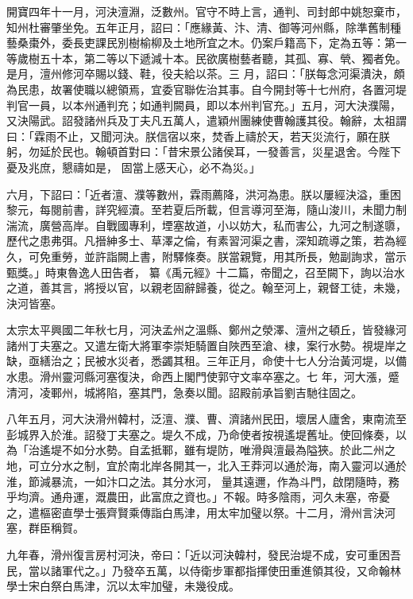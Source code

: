 \begin{pinyinscope}
 開寶四年十一月，河決澶淵，泛數州。官守不時上言，通判、司封郎中姚恕棄市，知州杜審肇坐免。五年正月，詔曰：「應緣黃、汴、清、御等河州縣，除準舊制種藝桑棗外，委長吏課民別樹榆柳及土地所宜之木。仍案戶籍高下，定為五等：第一等歲樹五十本，第二等以下遞減十本。民欲廣樹藝者聽，其孤、寡、煢、獨者免。是月，澶州修河卒賜以錢、鞋，役夫給以茶。三
 月，詔曰：「朕每念河渠潰決，頗為民患，故署使職以總領焉，宜委官聯佐治其事。自今開封等十七州府，各置河堤判官一員，以本州通判充；如通判闕員，即以本州判官充。」五月，河大決濮陽，又決陽武。詔發諸州兵及丁夫凡五萬人，遣穎州團練使曹翰護其役。翰辭，太祖謂曰：「霖雨不止，又聞河決。朕信宿以來，焚香上禱於天，若天災流行，願在朕躬，勿延於民也。翰頓首對曰：「昔宋景公諸侯耳，一發善言，災星退舍。今陛下憂及兆庶，懇禱如是，
 固當上感天心，必不為災。」



 六月，下詔曰：「近者澶、濮等數州，霖雨薦降，洪河為患。朕以屢經決溢，重困黎元，每閱前書，詳究經瀆。至若夏后所載，但言導河至海，隨山浚川，未聞力制湍流，廣營高岸。自戰國專利，堙塞故道，小以妨大，私而害公，九河之制遂隳，歷代之患弗弭。凡搢紳多士、草澤之倫，有素習河渠之書，深知疏導之策，若為經久，可免重勞，並許詣闕上書，附驛條奏。朕當親覽，用其所長，勉副詢求，當示甄獎。」時東魯逸人田告者，
 纂《禹元經》十二篇，帝聞之，召至闕下，詢以治水之道，善其言，將授以官，以親老固辭歸養，從之。翰至河上，親督工徒，未幾，決河皆塞。



 太宗太平興國二年秋七月，河決孟州之溫縣、鄭州之滎澤、澶州之頓丘，皆發緣河諸州丁夫塞之。又遣左衛大將軍李崇矩騎置自陜西至滄、棣，案行水勢。視堤岸之缺，亟繕治之；民被水災者，悉蠲其租。三年正月，命使十七人分治黃河堤，以備水患。滑州靈河縣河塞復決，命西上閣門使郭守文率卒塞之。七
 年，河大漲，蹙清河，凌鄆州，城將陷，塞其門，急奏以聞。詔殿前承旨劉吉馳往固之。



 八年五月，河大決滑州韓村，泛澶、濮、曹、濟諸州民田，壞居人廬舍，東南流至彭城界入於淮。詔發丁夫塞之。堤久不成，乃命使者按視遙堤舊址。使回條奏，以為「治遙堤不如分水勢。自孟抵鄆，雖有堤防，唯滑與澶最為隘狹。於此二州之地，可立分水之制，宜於南北岸各開其一，北入王莽河以通於海，南入靈河以通於淮，節減暴流，一如汴口之法。其分水河，
 量其遠邇，作為斗門，啟閉隨時，務乎均濟。通舟運，溉農田，此富庶之資也。」不報。時多陰雨，河久未塞，帝憂之，遣樞密直學士張齊賢乘傳詣白馬津，用太牢加璧以祭。十二月，滑州言決河塞，群臣稱賀。



 九年春，滑州復言房村河決，帝曰：「近以河決韓村，發民治堤不成，安可重困吾民，當以諸軍代之。」乃發卒五萬，以侍衛步軍都指揮使田重進領其役，又命翰林學士宋白祭白馬津，沉以太牢加璧，未幾役成。




\end{pinyinscope}
